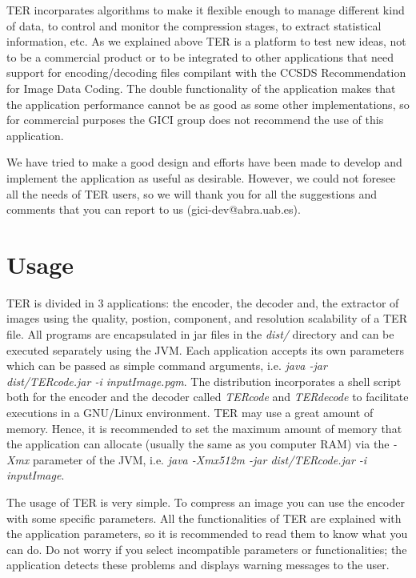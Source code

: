 \documentclass[a4paper,10pt]{article}
\begin{document}
TER incorparates algorithms to make it flexible enough to manage
different kind of data, to control and monitor the compression 
stages, to extract statistical information, etc. As we explained
above TER is a platform to test new ideas, not to be a commercial
product or to be integrated to other applications that need support
for encoding/decoding files compilant with the CCSDS Recommendation
for Image Data Coding. The double functionality of the application
makes that the application performance cannot be as good as some other
implementations, so for commercial purposes the GICI group does not
recommend the use of this application.

We have tried to make a good design and efforts have been made to
develop and implement the application as useful as
desirable. However, we could not foresee all the needs of TER
users, so we will thank you for all the suggestions and comments
that you can report to us (gici-dev@abra.uab.es). 

\flushleft{} 

\newpage
\section{Usage}
\label{sect:usage}

TER is divided in 3 applications: the encoder, the decoder
and, the extractor of images using the quality, postion,
component, and resolution scalability of a TER file. All
programs are encapsulated in jar files in the \emph{dist/}
directory and can be executed separately using the JVM. Each
application accepts its own parameters which can be passed as
simple command arguments, i.e. \emph{java -jar dist/TERcode.jar -i
  inputImage.pgm}. The distribution incorporates a shell script both 
for the encoder and the decoder called \emph{TERcode} and
\emph{TERdecode} to facilitate executions in a GNU/Linux
environment. TER may use a great amount of memory. Hence, it is
recommended to set the maximum amount of memory that the
application can allocate (usually the same as you computer RAM) via
the \emph{-Xmx} parameter of the JVM, i.e. \emph{java -Xmx512m -jar
  dist/TERcode.jar -i inputImage}.  


The usage of TER is very simple. To compress an image you can use
the encoder with some specific parameters. All the functionalities of
TER are explained with the application parameters, so 
it is recommended to read them to know what you can do. Do not
worry if you select incompatible parameters or functionalities; the
application detects these problems and displays warning messages to
the user. 
\end{document}

